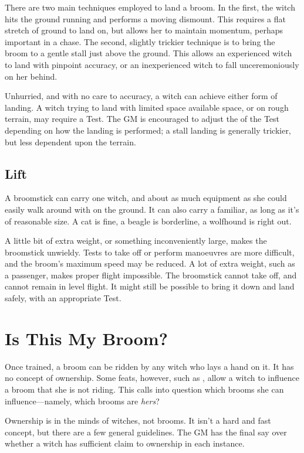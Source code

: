 There are two main techniques employed to land a broom.
In the first, the witch hits the ground running and performs a moving dismount.
This requires a flat stretch of ground to land on, but allows her to maintain momentum, perhaps important in a chase.
The second, slightly trickier technique is to bring the broom to a gentle stall just above the ground.
This allows an experienced witch to land with pinpoint accuracy, or an inexperienced witch to fall unceremoniously on her behind.

Unhurried, and with no care to accuracy, a witch can achieve either form of landing.
A witch trying to land with limited space available space, or on rough terrain, may require a Test.
The GM is encouraged to adjust the {\tn} of the Test depending on how the landing is performed; a stall landing is generally trickier, but less dependent upon the terrain.

\subsection{Lift}

A broomstick can carry one witch, and about as much equipment as she could easily walk around with on the ground.
It can also carry a familiar, as long as it's of reasonable size.
A cat is fine, a beagle is borderline, a wolfhound is right out.

A little bit of extra weight, or something inconveniently large, makes the broomstick unwieldy.
Tests to take off or perform manoeuvres are more difficult, and the broom's maximum speed may be reduced.
A lot of extra weight, such as a passenger, makes proper flight impossible.
The broomstick cannot take off, and cannot remain in level flight.
It might still be possible to bring it down and land safely, with an appropriate Test.



\section{Is This My Broom?}

Once trained, a broom can be ridden by any witch who lays a hand on it.
It has no concept of ownership.
Some feats, however, such as , allow a witch to influence a broom that she is not riding.
This calls into question which brooms she can influence---namely, which brooms are \emph{hers}?

Ownership is in the minds of witches, not brooms.
It isn't a hard and fast concept, but there are a few general guidelines.
The GM has the final say over whether a witch has sufficient claim to ownership in each instance.

